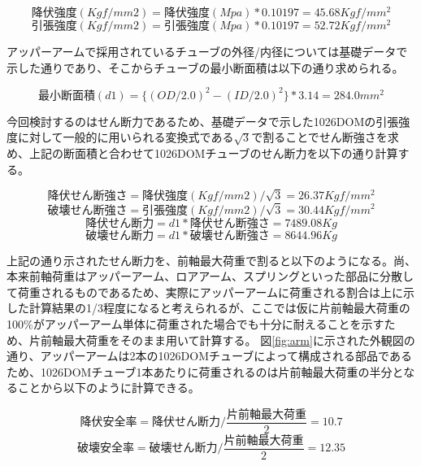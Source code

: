 \documentclass[dvipdfmx]{jsarticle}
\begin{document}
\begin{displaymath}
  降伏強度(Kgf/mm2) = 降伏強度(Mpa) * 0.10197 = 45.68Kgf/mm^2
\end{displaymath}
\begin{displaymath}
  引張強度(Kgf/mm2) = 引張強度(Mpa) * 0.10197 = 52.72Kgf/mm^2
\end{displaymath}

アッパーアームで採用されているチューブの外径/内径については基礎データで示した通りであり、そこからチューブの最小断面積は以下の通り求められる。

\begin{displaymath}
  最小断面積(d1) = \{(OD / 2.0) ^ 2 - (ID / 2.0) ^ 2\} * 3.14 = 284.0mm^2
\end{displaymath}

今回検討するのはせん断力であるため、基礎データで示した1026DOMの引張強度に対して一般的に用いられる変換式である$\sqrt{3}$で割ることでせん断強さを求め、上記の断面積と合わせて1026DOMチューブのせん断力を以下の通り計算する。

\begin{displaymath}
  降伏せん断強さ = 降伏強度(Kgf/mm2) / \sqrt{3} = 26.37Kgf/mm^2
\end{displaymath}
\begin{displaymath}
  破壊せん断強さ = 引張強度(Kgf/mm2) / \sqrt{3} = 30.44Kgf/mm^2
\end{displaymath}
\begin{displaymath}
  降伏せん断力 = d1 * 降伏せん断強さ = 7489.08Kg
\end{displaymath}
\begin{displaymath}
  破壊せん断力 = d1 * 破壊せん断強さ = 8644.96Kg
\end{displaymath}

上記の通り示されたせん断力を、前軸最大荷重で割ると以下のようになる。尚、本来前軸荷重はアッパーアーム、ロアアーム、スプリングといった部品に分散して荷重されるものであるため、実際にアッパーアームに荷重される割合は上に示した計算結果の1/3程度になると考えられるが、ここでは仮に片前軸最大荷重の100\%がアッパーアーム単体に荷重された場合でも十分に耐えることを示すため、片前軸最大荷重をそのまま用いて計算する。
図\ref{fig:arm}に示された外観図の通り、アッパーアームは2本の1026DOMチューブによって構成される部品であるため、1026DOMチューブ1本あたりに荷重されるのは片前軸最大荷重の半分となることから以下のように計算できる。

\begin{displaymath}
  降伏安全率 = 降伏せん断力 / \frac{片前軸最大荷重}{2} = 10.7
\end{displaymath}
\begin{displaymath}
  破壊安全率 = 破壊せん断力 / \frac{片前軸最大荷重}{2} = 12.35
\end{displaymath}
\end{document}
